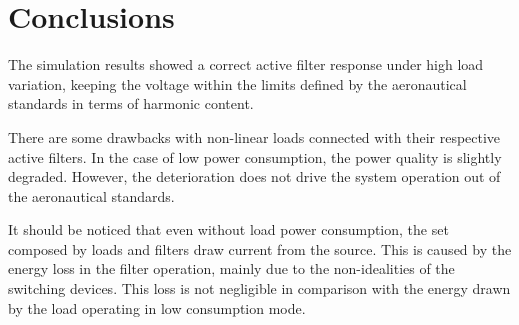 \section{Conclusions}

The simulation results showed a correct active filter response under high load variation, keeping the voltage within the limits defined by the aeronautical standards in terms of harmonic content.

There are some drawbacks with non-linear loads connected with their respective active filters. In the case of low power consumption, the power quality is slightly degraded. However, the deterioration does not drive the system operation out of the aeronautical standards.

It should be noticed that even without load power consumption, the set composed by loads and filters draw current from the source. This is caused by the energy loss in the filter operation, mainly due to the non-idealities of the switching devices. This loss is not negligible in comparison with the energy drawn by the load operating in low consumption mode.
